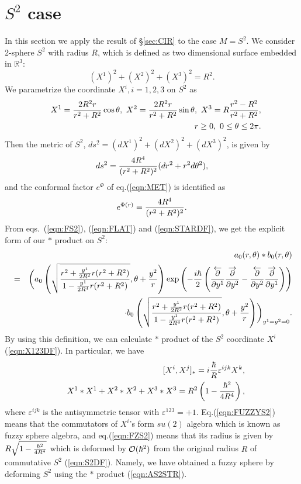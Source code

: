 \documentclass[12pt,a4paper]{article}
\def\h{\hbar}
\begin{document}
\section{$S^2$ case\label{sec:S2}}
In this section we apply the result of \S\ref{sec:CIR} to the case $M=S^2$.
We consider 2-sphere $S^2$ with radius $R$, which is defined as two dimensional surface embedded in ${\mathbb R}^3$:
\begin{equation}
\label{eqn:S2DF}
(X^1)^2+(X^2)^2+(X^3)^2=R^2.
\end{equation}
We parametrize the coordinate $X^i,i=1,2,3$ on $S^2$ as 
\begin{eqnarray}
\label{eqn:X123DF}
&&X^1={2R^2r\over r^2+R^2}\cos\theta,\ X^2={2R^2r\over
  r^2+R^2}\sin\theta,\ X^3=R{r^2-R^2\over r^2+R^2},\nonumber\\
&&r\geq0,\ 0\leq\theta\leq2\pi.
\end{eqnarray}
Then the metric of $S^2$, $ds^2=(dX^1)^2+(dX^2)^2+(dX^3)^2$, is given by
\begin{equation}
\label{eqn:S2DS2}
ds^2={4R^4\over(r^2+R^2)^2}(dr^2+r^2d\theta^2),
\end{equation}
and the conformal factor $e^{\Phi}$ of eq.(\ref{eqn:MET}) is
identified as
\begin{equation}
\label{eqn:FS2}
e^{\Phi(r)}={4R^4\over(r^2+R^2)^2}.
\end{equation}
From eqs.\ (\ref{eqn:FS2}), (\ref{eqn:FLAT}) and (\ref{eqn:STARDF}),
we get the  explicit form of our  $*$ product on $S^2$:
\begin{eqnarray}
\label{eqn:AS2STR}
&&a_0(r,\theta)*b_0(r,\theta)\nonumber\\
&=&\biggl(a_0\left(\sqrt{r^2+{y^1\over2R^2}r(r^2+R^2)\over1-{y^1\over2R^4}r(r^2+R^2)},\theta+{y^2\over
    r}\right)\exp\left(-{i\h\over2}\left({{\overleftarrow
        \partial}\over\partial y^1}{{\overrightarrow
        \partial}\over\partial y^2}-{{\overleftarrow
        \partial}\over\partial y^2}{{\overrightarrow
        \partial}\over\partial y^1}\right)\right)\nonumber\\
&&\cdot
b_0\left(\sqrt{r^2+{y^1\over2R^2}r(r^2+R^2)\over1-{y^1\over2R^4}r(r^2+R^2)},\theta+{y^2\over
    r}\right)\biggr)_{y^1=y^2=0}.
\end{eqnarray}
By using this definition, we can calculate $*$ product of the $S^2$
coordinate $X^i$ (\ref{eqn:X123DF}). In particular, we have
\begin{eqnarray}
\label{eqn:FUZZYS2}
&&[X^i,X^j]_*=i{\h\over R}\varepsilon^{ijk}X^k,\\
\label{eqn:FZS2}
&&X^1*X^1+X^2*X^2+X^3*X^3=R^2\left(1-{\h^2\over4R^4}\right),
\end{eqnarray}
where $\varepsilon^{ijk}$ is the antisymmetric tensor with
$\varepsilon^{123}=+1$.
Eq.(\ref{eqn:FUZZYS2}) means that the commutators of $X^i$'s form
$su(2)$ algebra which is known as fuzzy sphere algebra, and
eq.(\ref{eqn:FZS2}) means that its radius is given by
$R\sqrt{1-{\h^2\over4R^4}}$
which is deformed by ${\cal O}(\h^2)$ from the original radius $R$ of
commutative $S^2$ (\ref{eqn:S2DF}).
Namely, we have obtained a fuzzy sphere by deforming $S^2$ using the $*$ product (\ref{eqn:AS2STR}).
\end{document}
